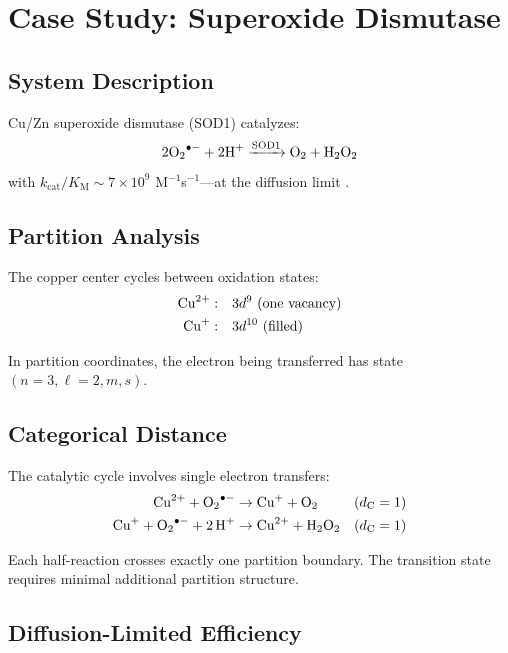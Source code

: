 ﻿\documentclass[twocolumn,10pt,a4paper]{article}
\theoremstyle{definition}
\theoremstyle{remark}
\newcommand{\kcat}{k_{\mathrm{cat}}}
\newcommand{\Km}{K_{\mathrm{M}}}
\newcommand{\dC}{d_{\mathrm{C}}}
\begin{document}
\section{Case Study: Superoxide Dismutase}
\label{sec:sod1}

\subsection{System Description}

Cu/Zn superoxide dismutase (SOD1) catalyzes:
\begin{equation}
    2 \ce{O2^{.-}} + 2 \ce{H+} \xrightarrow{\text{SOD1}} \ce{O2} + \ce{H2O2}
\end{equation}
with $\kcat/\Km \sim 7 \times 10^9$ M$^{-1}$s$^{-1}$---at the diffusion limit \citep{klug1972}.

\subsection{Partition Analysis}

The copper center cycles between oxidation states:
\begin{align}
    \ce{Cu^{2+}}: \quad & 3d^9 \text{ (one vacancy)} \\
    \ce{Cu^{+}}: \quad & 3d^{10} \text{ (filled)}
\end{align}

In partition coordinates, the electron being transferred has state $(n=3, \ell=2, m, s)$.

\subsection{Categorical Distance}

The catalytic cycle involves single electron transfers:
\begin{align}
    \ce{Cu^{2+} + O2^{.-}} &\to \ce{Cu^{+} + O2} && (\dC = 1) \\
    \ce{Cu^{+} + O2^{.-} + 2H+} &\to \ce{Cu^{2+} + H2O2} && (\dC = 1)
\end{align}

Each half-reaction crosses exactly one partition boundary. The transition state requires minimal additional partition structure.

\subsection{Diffusion-Limited Efficiency}
\end{document}
